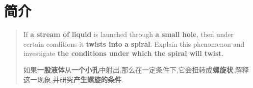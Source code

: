 \documentclass[UTF8]{gapd}
\begin{document}
\maketitle


\section{简介}
\label{sec:Introduction}
\begin{quote}
	If \textbf{a stream of liquid} is launched through \textbf{a small hole}, then under certain conditions it \textbf{twists into a spiral}. Explain this phenomenon and investigate \textbf{the conditions under which the spiral will twist}.
	
	如果\textbf{一股液体}从\textbf{一个小孔}中射出,那么在一定条件下,它会扭转成\textbf{螺旋状}.解释这一现象,并研究\textbf{产生螺旋的条件}.
\end{quote}



%

\end{document}
